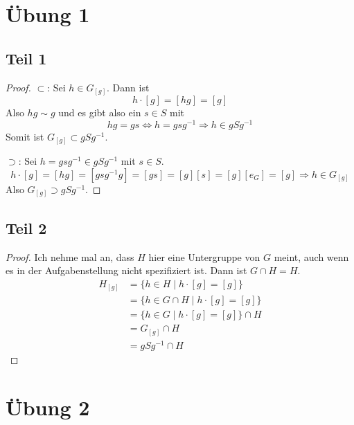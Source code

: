 \documentclass[10pt,a4paper]{article}
\begin{document}
\section{Übung 1}

\subsection{Teil 1}

\begin{proof}
  $\subset$: Sei $h \in G_{[g]}$.
  Dann ist
  \begin{equation}
    h \cdot [g] = [hg] = [g]
  \end{equation}
  Also $hg \sim g$ und es gibt also ein $s \in S$ mit
  \begin{equation}
    hg = gs \Leftrightarrow h = gsg^{-1} \Rightarrow h \in gSg^{-1}
  \end{equation}
  Somit ist $G_{[g]} \subset gSg^{-1}$.

  $\supset$: Sei $h = gsg^{-1} \in gSg^{-1}$ mit $s \in S$.
  \begin{equation}
    h \cdot [g] = [hg] = [gsg^{-1}g] = [gs] = [g][s] = [g][e_{G}] = [g] \Rightarrow h \in G_{[g]}
  \end{equation}
  Also $G_{[g]} \supset gSg^{-1}$.
\end{proof}

\subsection{Teil 2}

\begin{proof}
  Ich nehme mal an, dass $H$ hier eine Untergruppe von $G$ meint, auch wenn es in der Aufgabenstellung nicht spezifiziert ist.
  Dann ist $G \cap H = H$.
  \begin{align*}
    H_{[g]} & = \{ h \in H \mid h \cdot [g] = [g] \}\\
    & = \{ h \in G \cap H \mid h \cdot [g] = [g] \}\\
    & = \{ h \in G \mid h \cdot [g] = [g] \} \cap H\\
    & = G_{[g]} \cap H\\
    & = gSg^{-1} \cap H
  \end{align*}
\end{proof}

\section{Übung 2}
\end{document}
